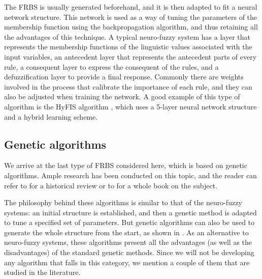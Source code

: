The FRBS is usually generated beforehand, and it is then adapted to fit a neural network structure. This network is used as a way of tuning the parameters of the membership function using the backpropagation algorithm, and thus retaining all the advantages of this technique. A typical neuro-fuzzy system has a layer that represents the membership functions of the linguistic values associated with the input variables, an antecedent layer that represents the antecedent parts of every rule, a consequent layer to express the consequent of the rules, and a defuzzification layer to provide a final response. Commonly there are weights involved in the process that calibrate the importance of each rule, and they can also be adjusted when training the network. A good example of this type of algorithm is the HyFIS algorithm \cite{kasabov1999hyfis}, which uses a 5-layer neural network structure and a hybrid learning scheme.

\subsection{Genetic algorithms}

We arrive at the last type of FRBS considered here, which is based on genetic algorithms. Ample research has been conducted on this topic, and the reader can refer to \cite{cordon2011historical} for a historical review or to \cite{cordon2001genetic} for a whole book on the subject.

The philosophy behind these algorithms is similar to that of the neuro-fuzzy systems: an initial structure is established, and then a genetic method is adapted to tune a specified set of parameters. But genetic algorithms can also be used to generate the whole structure from the start, as shown in \cite{cordon2001generating}. As an alternative to neuro-fuzzy systems, these algorithms present all the advantages (as well as the disadvantages) of the standard genetic methods. Since we will not be developing any algorithm that falls in this category, we mention a couple of them that are studied in the literature.

